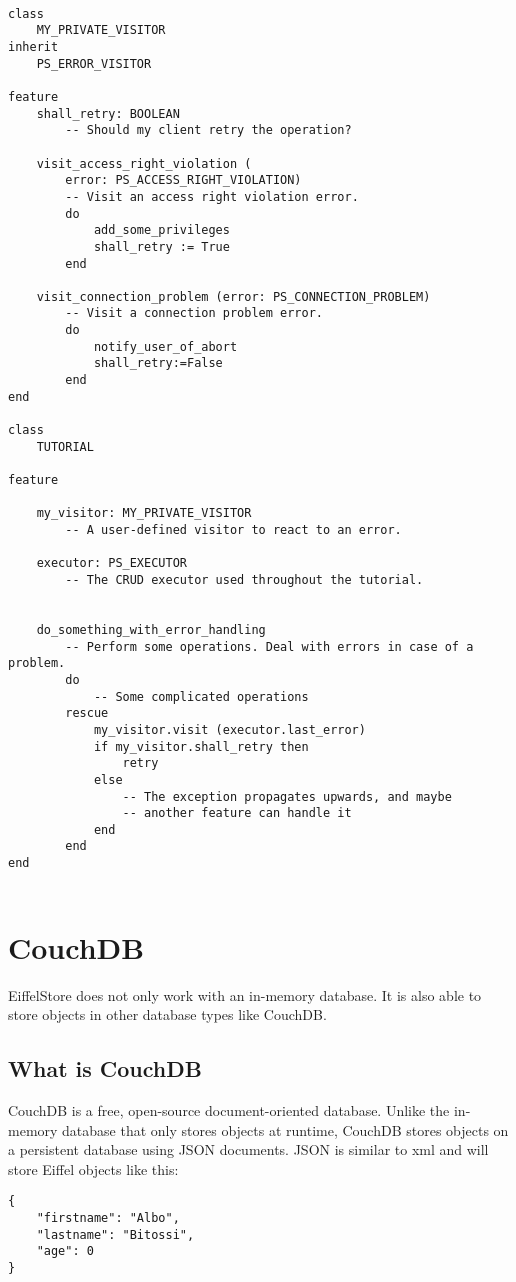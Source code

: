 \documentclass[a4paper,12pt]{report}
\begin{document}
\begin{lstlisting}[language=OOSC2Eiffel, captionpos=b, caption={Sample error handling using a visitor.}, label={lst:error_visitor_example}]

class
	MY_PRIVATE_VISITOR
inherit
	PS_ERROR_VISITOR

feature
	shall_retry: BOOLEAN
		-- Should my client retry the operation?

	visit_access_right_violation (
		error: PS_ACCESS_RIGHT_VIOLATION)
		-- Visit an access right violation error.
		do
			add_some_privileges
			shall_retry := True
		end

	visit_connection_problem (error: PS_CONNECTION_PROBLEM)
		-- Visit a connection problem error.
		do
			notify_user_of_abort
			shall_retry:=False
		end
end

class
	TUTORIAL

feature

	my_visitor: MY_PRIVATE_VISITOR
		-- A user-defined visitor to react to an error.

	executor: PS_EXECUTOR
		-- The CRUD executor used throughout the tutorial.


	do_something_with_error_handling
		-- Perform some operations. Deal with errors in case of a problem.
		do
			-- Some complicated operations
		rescue
			my_visitor.visit (executor.last_error)
			if my_visitor.shall_retry then
				retry
			else
				-- The exception propagates upwards, and maybe
				-- another feature can handle it
			end
		end
end


\end{lstlisting}


\chapter{CouchDB}

EiffelStore does not only work with an in-memory database. It is also able to store objects in other database types like CouchDB.

\section{What is CouchDB}

CouchDB is a free, open-source document-oriented database. Unlike the in-memory database that only stores objects at runtime, CouchDB stores objects on a persistent database using JSON documents.
JSON is similar to xml and will store Eiffel objects like this:
\begin{lstlisting}[language=OOSC2Eiffel, captionpos=b, caption={Sample Eiffel Object in JSON}, label={lst:error_visitor_example}]
{
	"firstname": "Albo",
	"lastname": "Bitossi",
	"age": 0
}
\end{lstlisting}
\end{document}
